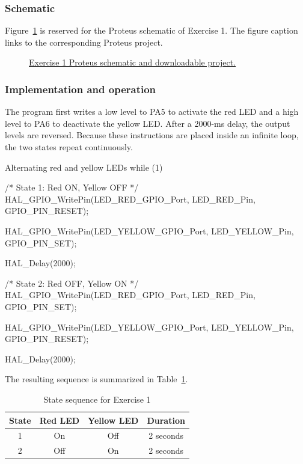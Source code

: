 \documentclass[a4paper]{article}
\newcommand{\exerciseOneURL}{https://github.com/USERNAME/REPOSITORY}
\begin{document}
\subsubsection{Schematic}

Figure~\ref{fig:exercise1-schematic} is reserved for the Proteus schematic of
Exercise 1. The figure caption links to the corresponding Proteus project.

\begin{figure}[H]
    \centering
    \caption{\href{\exerciseOneURL}{Exercise 1 Proteus schematic and downloadable project.}}
    \label{fig:exercise1-schematic}
\end{figure}

\subsubsection{Implementation and operation}

The program first writes a low level to PA5 to activate the red LED and a high
level to PA6 to deactivate the yellow LED. After a 2000-ms delay, the output
levels are reversed. Because these instructions are placed inside an infinite
loop, the two states repeat continuously.

\begin{stmcode}{Alternating red and yellow LEDs}
while (1)
{
    /* State 1: Red ON, Yellow OFF */
    HAL_GPIO_WritePin(LED_RED_GPIO_Port,
                      LED_RED_Pin,
                      GPIO_PIN_RESET);

    HAL_GPIO_WritePin(LED_YELLOW_GPIO_Port,
                      LED_YELLOW_Pin,
                      GPIO_PIN_SET);

    HAL_Delay(2000);

    /* State 2: Red OFF, Yellow ON */
    HAL_GPIO_WritePin(LED_RED_GPIO_Port,
                      LED_RED_Pin,
                      GPIO_PIN_SET);

    HAL_GPIO_WritePin(LED_YELLOW_GPIO_Port,
                      LED_YELLOW_Pin,
                      GPIO_PIN_RESET);

    HAL_Delay(2000);
}
\end{stmcode}

The resulting sequence is summarized in Table~\ref{tab:exercise1-sequence}.

\begin{table}[H]
    \centering
    \caption{State sequence for Exercise 1}
    \label{tab:exercise1-sequence}
    \begin{tabular}{cccc}
        \toprule
        \textbf{State} & \textbf{Red LED} & \textbf{Yellow LED} & \textbf{Duration} \\
        \midrule
        1 & On & Off & 2 seconds \\
        2 & Off & On & 2 seconds \\
        \bottomrule
    \end{tabular}
\end{table}
\end{document}
